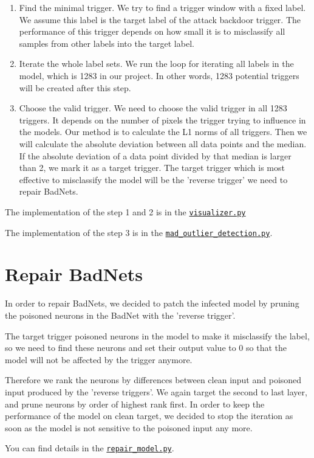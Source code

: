 \documentclass{article}
\begin{document}
\begin{enumerate}
    \item Find the minimal trigger. We try to find a trigger window with a fixed label. We assume this label is the target label of the attack backdoor trigger. The performance of this trigger depends on how small it is to misclassify all samples from other labels into the target label.
    
    \item Iterate the whole label sets. We run the loop for iterating all labels in the model, which is 1283 in our project. In other words, 1283 potential triggers will be created after this step.
    
    \item Choose the valid trigger. We need to choose the valid trigger in all 1283 triggers. It depends on the number of pixels the trigger trying to influence in the models. Our method is to calculate the L1 norms of all triggers. Then we will calculate the absolute deviation between all data points and the median. If the absolute deviation of a data point divided by that median is larger than 2, we mark it as a target trigger. The target trigger which is most effective to misclassify the model will be the 'reverse trigger' we need to repair BadNets.
\end{enumerate}

The implementation of the step 1 and 2 is in the \href{https://github.com/zjzsliyang/CSAW-HackML-2020/blob/master/visualizer.py}{\texttt{visualizer.py}}

The implementation of the step 3 is in the \href{https://github.com/zjzsliyang/CSAW-HackML-2020/blob/master/mad_outlier_detection.py}{\texttt{mad\_outlier\_detection.py}}.


\section{Repair BadNets}


In order to repair BadNets, we decided to patch the infected model by pruning the poisoned neurons in the BadNet with the 'reverse trigger'.

The target trigger poisoned neurons in the model to make it misclassify the label, so we need to find these neurons and set their output value to 0 so that the model will not be affected by the trigger anymore. 

Therefore we rank the neurons by differences between clean input and poisoned input produced by the 'reverse triggers'. We again target the second to last layer, and prune neurons by order of highest rank first. In order to keep the performance of the model on clean target, we decided to stop the iteration as soon as the model is not sensitive to the poisoned input any more.

You can find details in the \href{https://github.com/zjzsliyang/CSAW-HackML-2020/blob/master/repair_model.py}{\texttt{repair\_model.py}}.




\newpage
\end{document}
